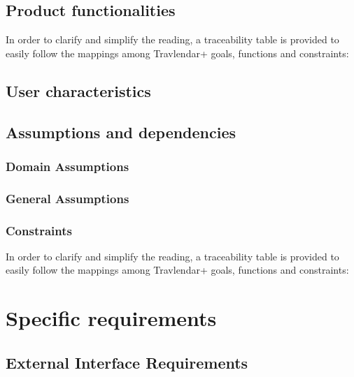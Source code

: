 \documentclass{article}
\begin{document}
\begin{itemize}
\clearpage

\subsection{Product functionalities}

In order to clarify and simplify the reading, a traceability table is provided to easily follow the mappings among Travlendar+ goals, functions and constraints: \\

\clearpage

\subsection{User characteristics}



\subsection{Assumptions and dependencies}

\subsubsection{Domain Assumptions}


\subsubsection{General Assumptions}


\subsubsection{Constraints}

In order to clarify and simplify the reading, a traceability table is provided to easily follow the mappings among Travlendar+ goals, functions and constraints: \\


\clearpage
\section{Specific requirements}

\subsection{External Interface Requirements}


\end{itemize}
\end{document}
